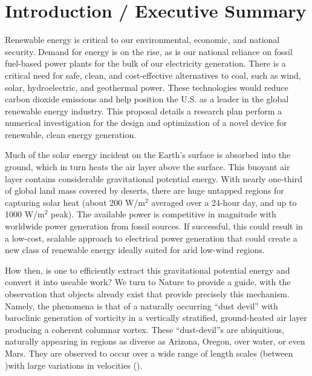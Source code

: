 \section{Introduction / Executive Summary}

Renewable energy is critical to our environmental, economic, and
national security. Demand for energy is on the rise, as is our national
reliance on fossil fuel-based power plants for the bulk of our
electricity generation. There is a critical need for safe, clean, and
cost-effective alternatives to coal, such as wind, solar, hydroelectric,
and geothermal power\cite{arpa-e}. These technologies would reduce carbon dioxide
emissions and help position the U.S. as a leader in the global renewable
energy industry. 
%
%
This proposal details a research plan perform a numerical investigation
for the design and optimization of a novel device for renewable, clean
energy generation. 

Much of the solar energy incident on the Earth's surface is absorbed
into the ground, which in turn heats the air layer above the surface.
This buoyant air layer contains considerable gravitational potential
energy. 
With nearly one-third of global land mass covered by deserts, there are huge
untapped regions for capturing solar heat (about 200 W/$\text{m}^2$ averaged over
a 24-hour day, and up to 1000 W/$\text{m}^2$ peak)\cite{something}.  The
available power is competitive in magnitude with worldwide power
generation from fossil sources. If successful, this could result in a
low-cost, scalable approach to electrical power generation that could
create a new class of renewable energy ideally suited for arid low-wind regions. 

How then, is one to efficiently extract this gravitational potential
energy and convert it into useable work? We turn to Nature to provide a 
guide, with the observation that objects already
exist that provide precisely this mechanism. Namely, the phenomena is
that of a naturally 
%
%
occurring ``dust devil'' with baroclinic generation of vorticity in a
vertically stratified, ground-heated air layer producing a coherent
columnar vortex. These ``dust-devil''s are ubiquitious, naturally appearing in
regions as diverse as Arizona, Oregon, over water, or even Mars\cite{mars}. 
They
are observed to occur over a wide range of length scales (between )with
large variations in 
velocities ()\cite{sinclair}. 

